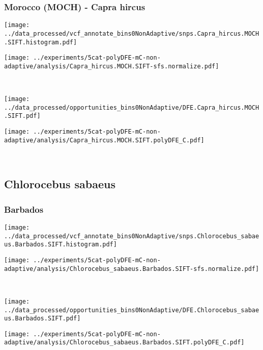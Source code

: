 \subsubsection{Morocco (MOCH) - Capra hircus}

\begin{minipage}{0.49\linewidth}
    \texttt{[image: ../data\_processed/vcf\_annotate\_bins0NonAdaptive/snps.Capra\_hircus.MOCH.SIFT.histogram.pdf]}
\end{minipage}
\begin{minipage}{0.49\linewidth}
    \texttt{[image: ../experiments/5cat-polyDFE-mC-non-adaptive/analysis/Capra\_hircus.MOCH.SIFT-sfs.normalize.pdf]}
\end{minipage}
\\
\begin{minipage}{0.49\linewidth}
    \texttt{[image: ../data\_processed/opportunities\_bins0NonAdaptive/DFE.Capra\_hircus.MOCH.SIFT.pdf]}
\end{minipage}
\begin{minipage}{0.49\linewidth}
    \texttt{[image: ../experiments/5cat-polyDFE-mC-non-adaptive/analysis/Capra\_hircus.MOCH.SIFT.polyDFE\_C.pdf]}
\end{minipage}
\\

\subsection{Chlorocebus sabaeus}

\subsubsection{Barbados}

\begin{minipage}{0.49\linewidth}
    \texttt{[image: ../data\_processed/vcf\_annotate\_bins0NonAdaptive/snps.Chlorocebus\_sabaeus.Barbados.SIFT.histogram.pdf]}
\end{minipage}
\begin{minipage}{0.49\linewidth}
    \texttt{[image: ../experiments/5cat-polyDFE-mC-non-adaptive/analysis/Chlorocebus\_sabaeus.Barbados.SIFT-sfs.normalize.pdf]}
\end{minipage}
\\
\begin{minipage}{0.49\linewidth}
    \texttt{[image: ../data\_processed/opportunities\_bins0NonAdaptive/DFE.Chlorocebus\_sabaeus.Barbados.SIFT.pdf]}
\end{minipage}
\begin{minipage}{0.49\linewidth}
    \texttt{[image: ../experiments/5cat-polyDFE-mC-non-adaptive/analysis/Chlorocebus\_sabaeus.Barbados.SIFT.polyDFE\_C.pdf]}
\end{minipage}
\\

